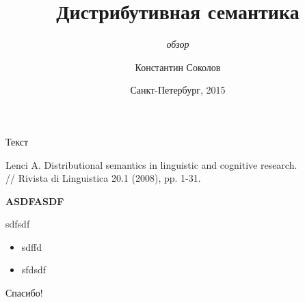 \documentclass{beamer}
\begin{document}
\title{\Large{\sc Дистрибутивная семантика}}
\subtitle{\small{\textit{обзор}}}
\author{Константин Соколов}
\date{Санкт-Петербург, 2015} 

\begin{frame}
    \thispagestyle{empty}
    \titlepage
\end{frame}

\begin{frame}{Текст}
\setcounter{framenumber}{1}
\begin{center}
\small{Lenci A. Distributional semantics in linguistic and cognitive research.\\// Rivista di Linguistica 20.1 (2008), pp. 1-31.}
\end{center}
\end{frame}

\begin{frame}{}
\begin{center}
	\textbf{ASDFASDF}
\end{center}
\end{frame}

\iffalse
\begin{frame}{dsfsdf}
\begin{center}
	\begin{figure}[H]
		\texttt{[image: harmonic1.png]} 
	\end{figure}
\end{center}
\end{frame}
\fi

\begin{frame}{sdfsdf}
\begin{itemize}
	\item sdffd
	\item sfdsdf
\end{itemize}
\end{frame}


\begin{frame}{}
    \thispagestyle{empty}
    \begin{center}
        {\large Спасибо!}
    \end{center}
\end{frame}
\end{document}
